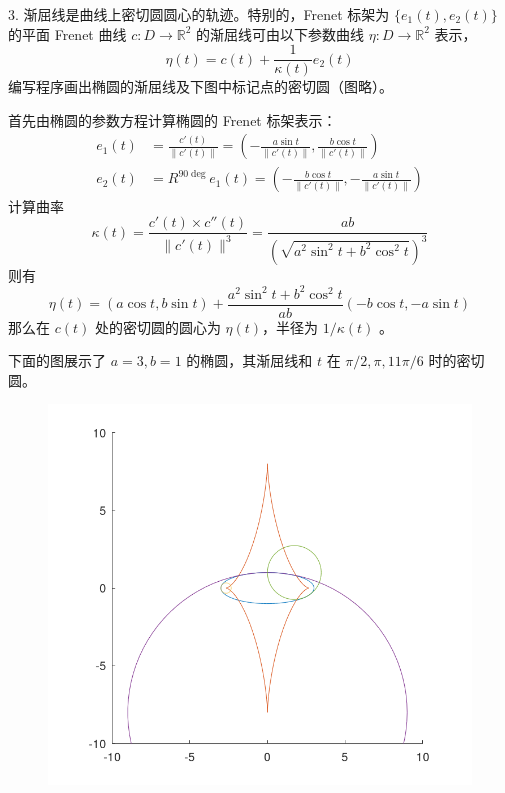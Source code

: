 ﻿\documentclass{article}
\begin{document}
3. 渐屈线是曲线上密切圆圆心的轨迹。特别的，Frenet 标架为 $ \{e_1(t), e_2(t)\} $ 的平面 Frenet 曲线 $ c : D \rightarrow \mathbb R ^2 $ 的渐屈线可由以下参数曲线 $ \eta : D \rightarrow \mathbb R^2 $ 表示，
$$
\eta(t) = c(t) + \frac{1}{\kappa(t)} e_2(t)
$$
编写程序画出椭圆的渐屈线及下图中标记点的密切圆（图略）。

首先由椭圆的参数方程计算椭圆的 Frenet 标架表示：
\begin{align*}
	e_1(t) &= \frac{c'(t)}{\|c'(t)\|} = (-\frac{a \sin t}{\|c'(t)\|}, \frac{b \cos t}{\|c'(t)\|})\\
	e_2(t) &= R^{90\deg} e_1(t) = (-\frac{b \cos t}{\|c'(t)\|}, -\frac{a \sin t}{\|c'(t)\|})
\end{align*}
计算曲率
$$
\kappa(t) = \frac{c'(t) \times c''(t)}{\|c'(t)\|^3} = \frac{ab}{(\sqrt{a^2 \sin^2t + b^2 \cos^2t})^3}
$$
则有
$$
\eta(t) = (a \cos t, b \sin t) + \frac{a^2 \sin^2t + b^2 \cos^2t}{ab} (-b \cos t, -a \sin t)
$$
那么在 $ c(t) $ 处的密切圆的圆心为 $ \eta(t) $，半径为 $ 1/{\kappa(t)} $ 。

下面的图展示了 $ a = 3, b = 1 $ 的椭圆，其渐屈线和 $ t $ 在 $ \pi/2, \pi, 11\pi/6 $ 时的密切圆。
\begin{figure}[H]
	\centering
	\includegraphics[width=\textwidth]{fig-4}\\
	\label{fig:fig-4}
\end{figure}
\end{document}
